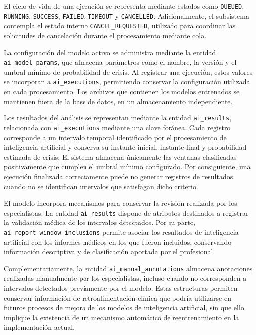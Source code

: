 El ciclo de vida de una ejecución se representa mediante estados como \texttt{QUEUED}, \texttt{RUNNING}, \texttt{SUCCESS}, \texttt{FAILED}, \texttt{TIMEOUT} y \texttt{CANCELLED}. Adicionalmente, el subsistema contempla el estado interno \texttt{CANCEL\_REQUESTED}, utilizado para coordinar las solicitudes de cancelación durante el procesamiento mediante cola.

La configuración del modelo activo se administra mediante la entidad \texttt{ai\_model\_params}, que almacena parámetros como el nombre, la versión y el umbral mínimo de probabilidad de crisis. Al registrar una ejecución, estos valores se incorporan a \texttt{ai\_executions}, permitiendo conservar la configuración utilizada en cada procesamiento. Los archivos que contienen los modelos entrenados se mantienen fuera de la base de datos, en un almacenamiento independiente.

Los resultados del análisis se representan mediante la entidad \texttt{ai\_results}, relacionada con \texttt{ai\_executions} mediante una clave foránea. Cada registro corresponde a un intervalo temporal identificado por el procesamiento de inteligencia artificial y conserva su instante inicial, instante final y probabilidad estimada de crisis. El sistema almacena únicamente las ventanas clasificadas positivamente que cumplen el umbral mínimo configurado. Por consiguiente, una ejecución finalizada correctamente puede no generar registros de resultados cuando no se identifican intervalos que satisfagan dicho criterio.

El modelo incorpora mecanismos para conservar la revisión realizada por los especialistas. La entidad \texttt{ai\_results} dispone de atributos destinados a registrar la validación médica de los intervalos detectados. Por su parte, \texttt{ai\_report\_window\_inclusions} permite asociar los resultados de inteligencia artificial con los informes médicos en los que fueron incluidos, conservando información descriptiva y de clasificación aportada por el profesional.

Complementariamente, la entidad \texttt{ai\_manual\_annotations} almacena anotaciones realizadas manualmente por los especialistas, incluso cuando no corresponden a intervalos detectados previamente por el modelo. Estas estructuras permiten conservar información de retroalimentación clínica que podría utilizarse en futuros procesos de mejora de los modelos de inteligencia artificial, sin que ello implique la existencia de un mecanismo automático de reentrenamiento en la implementación actual.

